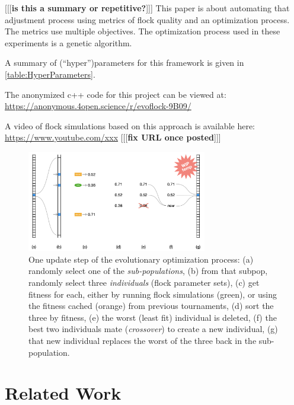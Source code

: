 \documentclass[letterpaper]{article}
\begin{document}
[[[\textbf{is this a summary or repetitive?}]]] This paper is about automating that adjustment process using metrics of flock quality and an optimization process. The metrics use multiple objectives. The optimization process used in these experiments is a genetic algorithm.

A summary of (``hyper'')parameters for this framework is given in \ref{table:HyperParameters}.

The anonymized c++ code for this project can be viewed at:
\scriptsize
\url{https://anonymous.4open.science/r/evoflock-9B09/}
\normalsize

A video of flock simulations based on this approach is available here:
\scriptsize
\url{https://www.youtube.com/xxx}
\normalsize
[[[\textbf{fix URL once posted}]]]


\begin{figure}[t]
    \centering
    \includegraphics[width=0.7\textwidth]{images/temp_evo_update.png}
    \caption{One update step of the evolutionary optimization process: (a) randomly select one of the \textit{sub-populations}, (b) from that subpop, randomly select three \textit{individuals} (flock parameter sets), (c) get fitness for each, either by running flock simulations (green), or using the fitness cached (orange) from previous tournaments, (d) sort the three by fitness, (e) the worst (least fit) individual is deleted, (f) the best two individuals mate (\textit{crossover}) to create a new individual, (g) that new individual replaces the worst of the three back in the sub-population.}
    \label{fig:temp_evo_update}
\end{figure}


\section{Related Work}
\label{sec:related}
\end{document}

